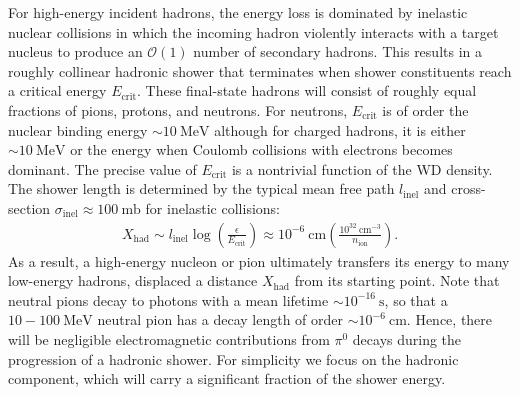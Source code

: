 \documentclass[twocolumn,preprintnumbers,amsmath,amssymb,prl, superscriptaddress]{revtex4}
\newcommand{\OO}{\mathcal{O}}
\newcommand{\MeV}{\text{MeV}}
\def\r{\right)}
\def\l{\left(}
\begin{document}
For high-energy incident hadrons, the energy loss is dominated by inelastic nuclear collisions in which the incoming hadron violently interacts with a target nucleus to produce an $\OO(1)$ number of secondary hadrons.
This results in a roughly collinear hadronic shower that terminates when shower constituents reach a critical energy $E_\text{crit}$.
These final-state hadrons will consist of roughly equal fractions of pions, protons, and neutrons.
For neutrons, $E_\text{crit}$ is of order the nuclear binding energy $\sim 10 ~\text{MeV}$ although for charged hadrons, it is either $\sim 10 ~\MeV$ or the energy when Coulomb collisions with electrons becomes dominant.
The precise value of $E_\text{crit}$ is a nontrivial function of the WD density.
The shower length is determined by the typical mean free path $l_\text{inel}$ and cross-section $\sigma_\text{inel} \approx 100 ~\text{mb}$ for inelastic collisions:
\begin{align}
\label{eq:hadlength}
  X_\text{had} \sim l_\text{inel} \log\l\frac{\epsilon}{E_\text{crit}}\r
  \approx 10^{-6} ~\text{cm} \l\frac{10^{32}~\text{cm}^{-3}}{n_\text{ion}}\r.
\end{align}
As a result, a high-energy nucleon or pion ultimately transfers its energy to many low-energy hadrons, displaced a distance $X_\text{had}$ from its starting point.
Note that neutral pions decay to photons with a mean lifetime $\sim 10^{-16} ~\text{s}$, so that a $10 - 100 ~\text{MeV}$ neutral pion has a decay length of order $\sim 10^{-6} ~\text{cm}$.
Hence, there will be negligible electromagnetic contributions from $\pi^0$ decays during the progression of a hadronic shower.
For simplicity we focus on the hadronic component, which will carry a significant fraction of the shower energy.
\end{document}
